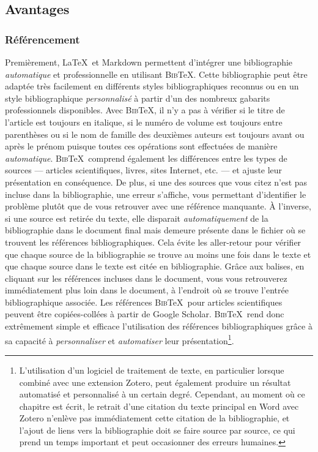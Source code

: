 \documentclass[
  letterpaper,
]{scrbook}
\begin{document}
\hypertarget{avantages-4}{%
\subsection{Avantages}\label{avantages-4}}

\hypertarget{ruxe9fuxe9rencement}{%
\subsubsection{Référencement}\label{ruxe9fuxe9rencement}}

Premièrement, \LaTeX~et Markdown permettent d'intégrer une bibliographie
\emph{automatique} et professionnelle en utilisant \textsc{Bib}\TeX.
Cette bibliographie peut être adaptée très facilement en différents
styles bibliographiques reconnus ou en un style bibliographique
\emph{personnalisé} à partir d'un des nombreux gabarits professionnels
disponibles. Avec \textsc{Bib}\TeX, il n'y a pas à vérifier si le titre
de l'article est toujours en italique, si le numéro de volume est
toujours entre parenthèses ou si le nom de famille des deuxièmes auteurs
est toujours avant ou après le prénom puisque toutes ces opérations sont
effectuées de manière \emph{automatique}. \textsc{Bib}\TeX~comprend
également les différences entre les types de sources --- articles
scientifiques, livres, sites Internet, etc. --- et ajuste leur
présentation en conséquence. De plus, si une des sources que vous citez
n'est pas incluse dans la bibliographie, une erreur s'affiche, vous
permettant d'identifier le problème plutôt que de vous retrouver avec
une référence manquante. À l'inverse, si une source est retirée du
texte, elle disparait \emph{automatiquement} de la bibliographie dans le
document final mais demeure présente dans le fichier où se trouvent les
références bibliographiques. Cela évite les aller-retour pour vérifier
que chaque source de la bibliographie se trouve au moins une fois dans
le texte et que chaque source dans le texte est citée en bibliographie.
Grâce aux balises, en cliquant sur les références incluses dans le
document, vous vous retrouverez immédiatement plus loin dans le
document, à l'endroit où se trouve l'entrée bibliographique associée.
Les références \textsc{Bib}\TeX~pour articles scientifiques peuvent être
copiées-collées à partir de Google Scholar. \textsc{Bib}\TeX~rend donc
extrêmement simple et efficace l'utilisation des références
bibliographiques grâce à sa capacité à \emph{personnaliser} et
\emph{automatiser} leur présentation\footnote{L'utilisation d'un
  logiciel de traitement de texte, en particulier lorsque combiné avec
  une extension Zotero, peut également produire un résultat automatisé
  et personnalisé à un certain degré. Cependant, au moment où ce
  chapitre est écrit, le retrait d'une citation du texte principal en
  Word avec Zotero n'enlève pas immédiatement cette citation de la
  bibliographie, et l'ajout de liens vers la bibliographie doit se faire
  source par source, ce qui prend un temps important et peut occasionner
  des erreurs humaines.}.
\end{document}
